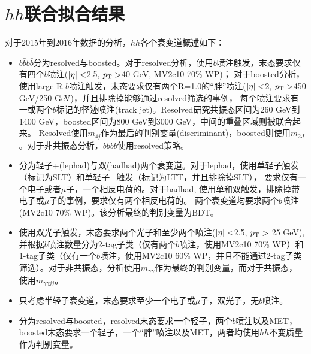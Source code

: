 \section{$hh$联合拟合结果}\label{sec:hh_comb}
对于2015年到2016年数据的分析，$hh$各个衰变道概述如下：
\begin{itemize}
 \item $b\bar{b}b\bar{b}$分为resolved与boosted。对于resolved分析，使用$b$喷注触发，末态要求仅有四个$b$喷注($|\eta| <$2.5, $p_{\text{T}} >$40 GeV, MV2c10 70\% WP)；
 对于boosted分析，使用large-R $b$喷注触发，末态要求仅有两个R=1.0的“胖”喷注($|\eta| <$2, $p_{\text{T}} >$450 GeV/250 GeV)，并且排除掉能够通过resolved筛选的事例，
 每个喷注要求有一或两个$b$标记的径迹喷注(track jet)。Resolved研究共振态区间为260 GeV到1400 GeV，boosted区间为800 GeV到3000 GeV，中间的重叠区域则被联合起来。
 Resolved使用$m_{4j}$作为最后的判别变量(discriminant)，boosted则使用$m_{2J}$。对于非共振态分析，$b\bar{b}b\bar{b}$使用resolved策略。
 
 \item \bbtt 分为轻子+\tauhad (lephad)与双\tauhad (hadhad)两个衰变道。对于lephad，使用单轻子触发（标记为SLT）和单轻子+\tauhad 触发（标记为LTT，并且排除掉SLT），
 要求仅有一个电子或者$\mu$子，一个相反电荷的\tauhad 。对于hadhad, 使用单\tauhad 和双\tauhad 触发，排除掉带电子或$\mu$子的事例，要求仅有两个相反电荷的\tauhad 。
 两个衰变道均要求两个$b$喷注(MV2c10 70\% WP)。该分析最终的判别变量为BDT。
 
 \item \bbaa 使用双光子触发，末态要求两个光子和至少两个喷注($|\eta| <$2.5, $p_{\text{T}} >$ 25 GeV), 并根据$b$喷注数量分为2-tag子类（仅有两个$b$喷注，使用MV2c10 70\% WP）和
 1-tag子类（仅有一个$b$喷注，使用MV2c10 60\% WP，并且不能通过2-tag子类筛选）。对于非共振态，分析使用$m_{\gamma\gamma}$作为最终的判别变量，而对于共振态，
 使用$m_{\gamma\gamma jj}$。
 
 \item \wwaa 只考虑半轻子衰变道，末态要求至少一个电子或$\mu$子，双光子，无$b$喷注。
\item \bbww 分为resolved与boosted，resolved末态要求一个轻子，两个$b$喷注以及MET，
 boosted末态要求一个轻子，一个“胖”喷注以及MET，两者均使用$hh$不变质量作为判别变量。
\end{itemize}

